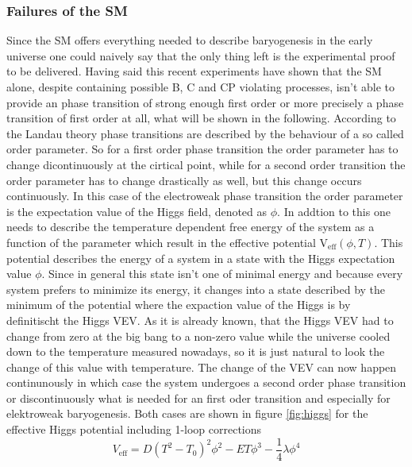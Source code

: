 \subsubsection{Failures of the SM}
Since the SM offers everything needed to describe baryogenesis in the early universe one could naively say that the only thing left is the experimental proof to be delivered. \newline
Having said this recent experiments have shown that the SM alone, despite containing possible B, C and CP violating processes, isn't able to provide an phase transition of strong enough first order or more precisely a phase transition of first order at all, what will be shown in the following. \newline
According to the Landau theory phase transitions are described by the behaviour of a so called order parameter. So for a first order phase transition the order parameter has to change dicontinuously at the cirtical point, while for a second order transition the order parameter has to change drastically as well, but this change occurs continuously. In this case of the electroweak phase transition the order parameter is the expectation value of the Higgs field, denoted as $\phi$. In addtion to this one needs to describe the temperature dependent free energy of the system as a function of the parameter which result in the effective potential V$_\text{eff}(\phi,T)$. This potential describes the energy of a system in a state with the Higgs expectation value $\phi$. Since in general this state isn't one of minimal energy and because every system prefers to minimize its energy, it changes into a state described by the minimum of the potential where the expaction value of the Higgs is by definitischt the Higgs VEV. \newline
As it is already known, that the Higgs VEV had to change from zero at the big bang to a non-zero value while the universe cooled down to the temperature measured nowadays, so it is just natural to look the change of this value with temperature. The change of the VEV can now happen continunously in which case the system undergoes a second order phase transition or discontinuously what is needed for an first oder transition and especially for elektroweak baryogenesis. 
Both cases are shown in figure \ref{fig:higgs} for the effective Higgs potential including 1-loop corrections \cite{Petropoulos:2003pm}
\begin{equation}
	V_\text{eff}=D(T^2-T_0)^2\phi^2-ET\phi^3-\frac{1}{4}\lambda\phi^4
	\label{effective_pot}
\end{equation}
